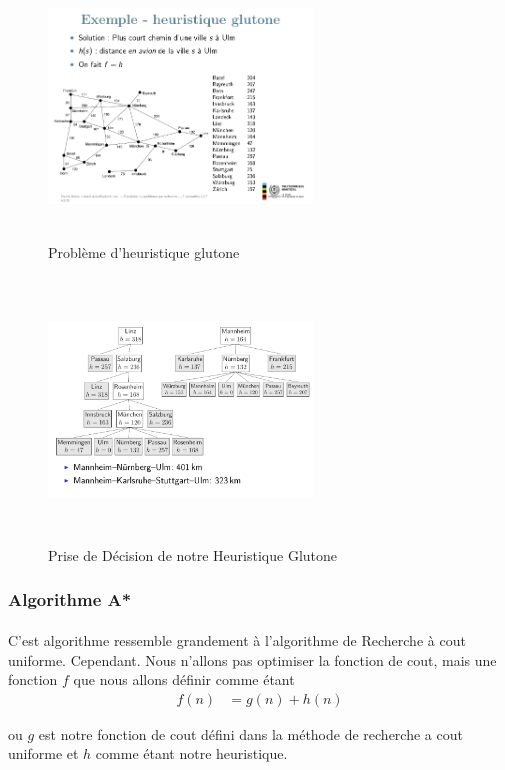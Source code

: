 \documentclass{book}
\begin{document}
\begin{figure}[!ht]
\centering
\includegraphics[width = 7cm, height = 7cm, keepaspectratio]{Heuristique_Glutone_Prob.png}
\caption{Problème d'heuristique glutone}
\label{fig:Prob_Heuristique_Glutone}
\end{figure}

\begin{figure}[!ht]
\centering
\includegraphics[width = 7cm, height = 7cm, keepaspectratio]{Heuristique_Glutone.png}
\caption{Prise de Décision de notre Heuristique Glutone}
\label{fig:Heuristique_Glutone}
\end{figure}

\subsubsection{Algorithme A*}
\paragraph{}
C'est algorithme ressemble grandement à l'algorithme de Recherche à cout uniforme. Cependant. Nous n'allons pas optimiser la fonction de cout, mais une fonction $f$ que nous allons définir comme étant
\begin{align*}
f(n) &= g(n) + h(n)
\end{align*}
\begin{center}
ou $g$ est notre fonction de cout défini dans la méthode de recherche a cout uniforme et $h$ comme étant notre heuristique. 
\end{center}
\end{document}
